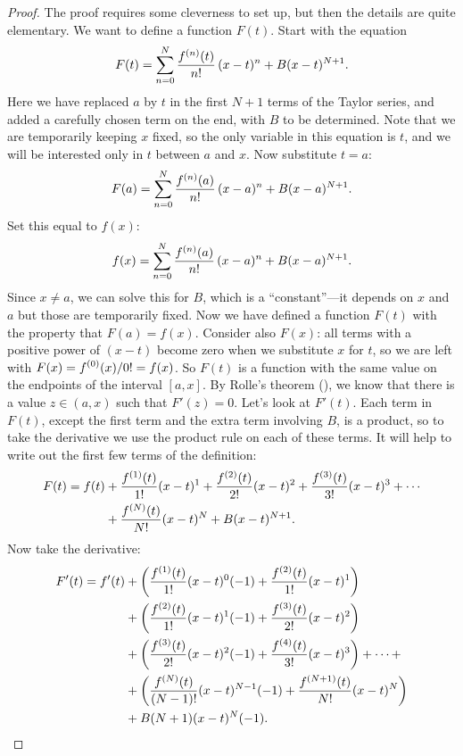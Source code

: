 \begin{proof}
The proof requires some cleverness to set up, but then the details are
quite elementary. We want to define a function $F(t)$. 
Start with the equation
$$F(t)=\sum_{n=0}^N{f^{(n)}(t)\over n!}\,(x-t)^n + B(x-t)^{N+1}.$$
Here we have replaced $a$ by $t$ in the first $N+1$ terms of the
Taylor series, and added a carefully chosen term on the end, with $B$
to be determined. Note that
we are temporarily keeping $x$ fixed, so the only variable in this
equation is $t$, and we will be interested
only in $t$ between $a$ and $x$. Now substitute $t=a$:
$$F(a)=\sum_{n=0}^N{f^{(n)}(a)\over n!}\,(x-a)^n + B(x-a)^{N+1}.$$
Set this equal to $f(x)$:
$$f(x)=\sum_{n=0}^N{f^{(n)}(a)\over n!}\,(x-a)^n + B(x-a)^{N+1}.$$
Since $x\not=a$, we can solve this for $B$, which is a
``constant''---it depends on $x$ and $a$ but those are temporarily 
fixed.  Now we
have defined a function $F(t)$ with the property that
$F(a)=f(x)$. Consider also $F(x)$: all terms with a positive power of
$(x-t)$ become zero when we substitute $x$ for $t$, so we are left
with $\displaystyle F(x)=f^{(0)}(x)/0!=f(x)$. So $F(t)$ is a function with the same
value on the endpoints of the interval $[a,x]$. 
By Rolle's theorem (), we
know that there is a value $z\in(a,x)$ such that $F'(z)=0$. Let's look
at $F'(t)$. Each term in $F(t)$, except the first term and the extra
term involving $B$, is a product, so to take the derivative we use the
product rule on each of these terms. It will help to write out the
first few terms of the definition:
\begin{align*}
  F(t)=f(t)&+{f^{(1)}(t)\over 1!}(x-t)^1+{f^{(2)}(t)\over 2!}(x-t)^2+
  {f^{(3)}(t)\over 3!}(x-t)^3+\cdots \\
  &+{f^{(N)}(t)\over N!}(x-t)^N+
  B(x-t)^{N+1}. \\
\end{align*}
Now take the derivative:
\begin{align*}
  F'(t) = f'(t) &+ 
  \left({f^{(1)}(t)\over 1!}(x-t)^0(-1)+{f^{(2)}(t)\over
    1!}(x-t)^1\right) \\
  &+\left({f^{(2)}(t)\over 1!}(x-t)^1(-1)+{f^{(3)}(t)\over
    2!}(x-t)^2\right) \\
  &+\left({f^{(3)}(t)\over 2!}(x-t)^2(-1)+{f^{(4)}(t)\over
    3!}(x-t)^3\right)+\dots+ \\
  &+\left({f^{(N)}(t)\over (N-1)!}(x-t)^{N-1}(-1)+{f^{(N+1)}(t)\over
    N!}(x-t)^N\right) \\
  &+B(N+1)(x-t)^N(-1). \\
\end{align*}

\end{proof}
